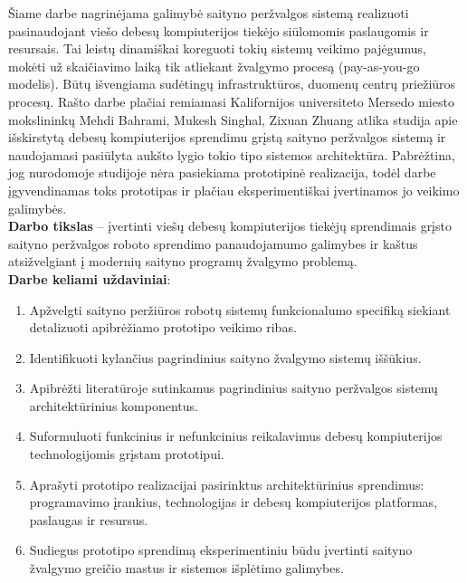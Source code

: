     Šiame darbe nagrinėjama galimybė saityno peržvalgos sistemą realizuoti pasinaudojant viešo debesų kompiuterijos tiekėjo siūlomomis paslaugomis ir resursais. Tai leistų dinamiškai koreguoti tokių sistemų veikimo pajėgumus, mokėti už skaičiavimo laiką tik atliekant žvalgymo procesą (pay-as-you-go modelis). Būtų išvengiama sudėtingų infrastruktūros, duomenų centrų priežiūros procesų. Rašto darbe plačiai remiamasi Kalifornijos universiteto Mersedo miesto mokslininkų Mehdi Bahrami, Mukesh Singhal, Zixuan Zhuang atlika studija \cite{MercedCloudBasedWebCrawler} apie išskirstytą debesų kompiuterijos sprendimu grįstą saityno peržvalgos sistemą ir naudojamasi pasiūlyta aukšto lygio tokio tipo sistemos architektūra. Pabrėžtina, jog nurodomoje studijoje nėra pasiekiama prototipinė realizacija, todėl darbe įgyvendinamas toks prototipas ir plačiau eksperimentiškai įvertinamos jo veikimo galimybės.
\\

\textbf{Darbo tikslas} -- įvertinti viešų debesų kompiuterijos tiekėjų sprendimais grįsto saityno peržvalgos roboto sprendimo panaudojamumo galimybes ir kaštus atsižvelgiant į modernių saityno programų žvalgymo problemą.
\\

\textbf{Darbe keliami uždaviniai}:

\begin{enumerate}
    \item Apžvelgti saityno peržiūros robotų sistemų funkcionalumo specifiką siekiant detalizuoti apibrėžiamo prototipo veikimo ribas.
    \item Identifikuoti kylančius pagrindinius saityno žvalgymo sistemų  iššūkius.
    \item Apibrėžti literatūroje sutinkamus pagrindinius saityno peržvalgos sistemų architektūrinius komponentus.
    \item Suformuluoti funkcinius ir nefunkcinius reikalavimus debesų kompiuterijos technologijomis grįstam prototipui.
    \item Aprašyti prototipo realizacijai pasirinktus architektūrinius sprendimus: programavimo įrankius, technologijas ir debesų kompiuterijos platformas, paslaugas ir resursus.
    \item Sudiegus prototipo sprendimą eksperimentiniu būdu įvertinti saityno žvalgymo greičio mastus ir sistemos išplėtimo galimybes.
\end{enumerate}